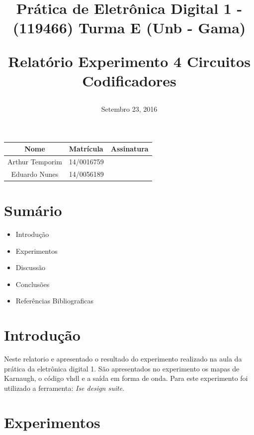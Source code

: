 \documentclass[12pts]{article}
\title{
	Prática de Eletrônica Digital 1 - (119466)
	\singlespacing
		Turma E (Unb - Gama)
	\singlespacing
	\begin{midpage}
	\begin {large}
		Relatório Experimento 4
		\singlespace
		Circuitos Codificadores
	\end {large}
	\end{midpage}
}
\date{Setembro 23, 2016}
\begin{document}
\maketitle	
\begin{center}

\begin{tabular}{|c|l|r|}
\hline
Nome & Matrícula & Assinatura\\
\hline

Arthur Temporim & 14/0016759 & \\
\hline	
Eduardo Nunes & 14/0056189 & \\

\hline	
\end{tabular}

\end{center}


\newpage

\section{Sumário}

\begin{itemize}
	\item Introdução
	\singlespacing
	\item Experimentos
	\singlespacing
	\item Discussão
	\singlespacing
	\item Conclusões 
	\singlespacing
	\item Referências Bibliograficas
	\singlespacing
\end{itemize}

\newpage


\section{Introdução}

	 Neste relatorio e apresentado o resultado do experimento realizado na aula da prática da eletrônica digital 1. São apresentados no experimento os mapas de Karnaugh, o código vhdl e a saída em forma de onda. Para este experimento foi utilizado a ferramenta: \textit{Ise design suite}.

\section{Experimentos}

\end{document}
